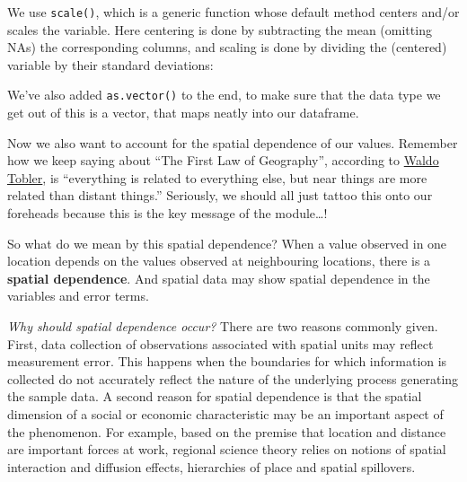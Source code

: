 \documentclass[]{book}
\newenvironment{Shaded}{\begin{snugshade}}{\end{snugshade}}
\newcommand{\CommentTok}[1]{\textcolor[rgb]{0.56,0.35,0.01}{\textit{#1}}}
\newcommand{\KeywordTok}[1]{\textcolor[rgb]{0.13,0.29,0.53}{\textbf{#1}}}
\newcommand{\NormalTok}[1]{#1}
\newcommand{\OperatorTok}[1]{\textcolor[rgb]{0.81,0.36,0.00}{\textbf{#1}}}
\newcommand{\StringTok}[1]{\textcolor[rgb]{0.31,0.60,0.02}{#1}}
\begin{document}
We use \texttt{scale()}, which is a generic function whose default method centers and/or scales the variable. Here centering is done by subtracting the mean (omitting NAs) the corresponding columns, and scaling is done by dividing the (centered) variable by their standard deviations:

\begin{Shaded}
\end{Shaded}

We've also added \texttt{as.vector()} to the end, to make sure that the data type we get out of this is a vector, that maps neatly into our dataframe.

Now we also want to account for the spatial dependence of our values. Remember how we keep saying about ``The First Law of Geography'', according to \href{https://en.wikipedia.org/wiki/Waldo_R._Tobler}{Waldo Tobler}, is ``everything is related to everything else, but near things are more related than distant things.'' Seriously, we should all just tattoo this onto our foreheads because this is the key message of the module\ldots{}!

So what do we mean by this spatial dependence? When a value observed in one location depends on the values observed at neighbouring locations, there is a \textbf{spatial dependence}. And spatial data may show spatial dependence in the variables and error terms.

\emph{Why should spatial dependence occur?} There are two reasons commonly given. First, data collection of observations associated with spatial units may reflect measurement error. This happens when the boundaries for which information is collected do not accurately reflect the nature of the underlying process generating the sample data. A second reason for spatial dependence is that the spatial dimension of a social or economic characteristic may be an important aspect of the phenomenon. For example, based on the premise that location and distance are important forces at work, regional science theory relies on notions of spatial interaction and diffusion effects, hierarchies of place and spatial spillovers.
\end{document}
